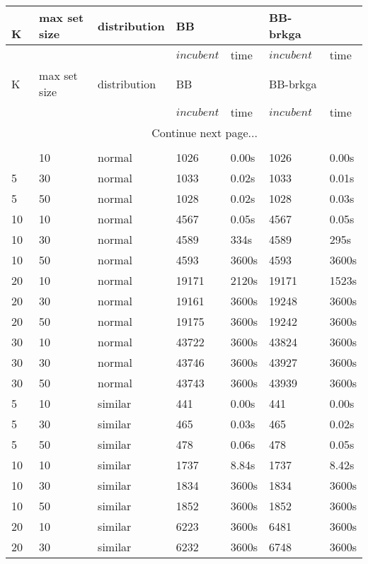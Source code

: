 \begin{scriptsize}
\setlength\LTleft{0pt}            %
\setlength\LTright{0pt}           %
\begin{longtable}{@{\extracolsep{\fill}}lllllll@{}}
\label{table:tests}\
\hline
K & max set size & distribution & BB & & BB-brkga\\ 
\hline
& & & $incubent$ & time & $incubent$ & time \\ 
\hline
\endfirsthead
\hline
K & max set size & distribution & BB & & BB-brkga\\ 
\hline
& & & $incubent$ & time & $incubent$ & time \\ 
\hline
\endhead
\hline \multicolumn{5}{r}{{Continue next page...}} \\ 
\endfoot
\multicolumn{5}{r}{{}} \\ 
\endlastfoot
 5 & 10 & normal& 1026& 0.00s& 1026& 0.00s \\
 5 & 30 & normal& 1033& 0.02s& 1033& 0.01s \\
 5 & 50 & normal& 1028& 0.02s& 1028& 0.03s \\
 10 & 10 & normal& 4567& 0.05s& 4567& 0.05s \\
 10 & 30 & normal& 4589& 334s & 4589& 295s \\
 10 & 50 & normal& 4593& 3600s& 4593& 3600s\\
 20 & 10 & normal& 19171& 2120s & 19171& 1523s \\
 20 & 30 & normal& 19161& 3600s& 19248& 3600s\\
 20 & 50 & normal& 19175& 3600s& 19242& 3600s\\
 30 & 10 & normal& 43722& 3600s& 43824& 3600s\\
 30 & 30 & normal& 43746& 3600s& 43927& 3600s\\
 30 & 50 & normal& 43743& 3600s& 43939& 3600s\\
 5 & 10 & similar& 441& 0.00s& 441& 0.00s \\
 5 & 30 & similar& 465& 0.03s& 465& 0.02s \\
 5 & 50 & similar& 478& 0.06s& 478& 0.05s \\
 10 & 10 & similar& 1737& 8.84s& 1737& 8.42s \\
 10 & 30 & similar& 1834& 3600s& 1834& 3600s\\
 10 & 50 & similar& 1852& 3600s& 1852& 3600s\\
 20 & 10 & similar& 6223& 3600s& 6481& 3600s\\
 20 & 30 & similar& 6232& 3600s& 6748& 3600s\\

\end{longtable}
\end{scriptsize}

